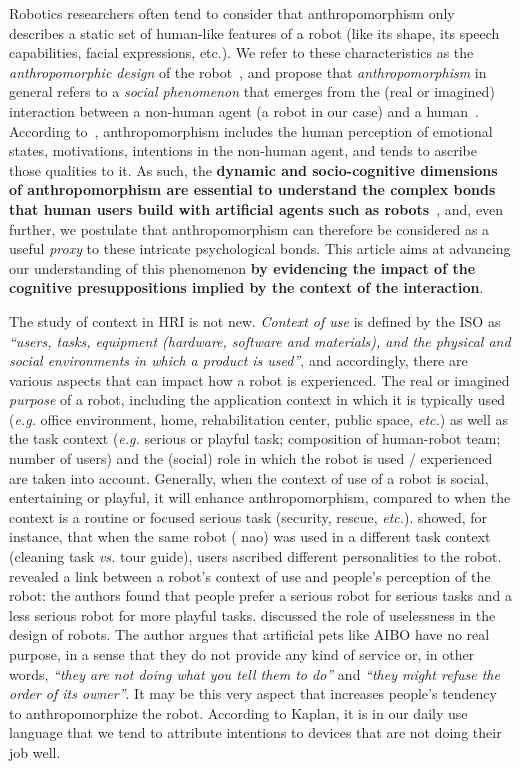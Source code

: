 \documentclass[a4,twocolumn,10pt]{article}
\newcommand{\eg}{\textit{e.g.}\xspace}
\newcommand{\etc}{\textit{etc.}\xspace}
\newcommand{\vs}{\textit{vs.}\xspace}
\begin{document}
Robotics researchers often tend to consider that anthropomorphism only describes
a static set of human-like features of a robot (like its shape, its speech
capabilities, facial expressions, etc.). We refer to these characteristics as
the \emph{anthropomorphic design} of the
robot~\cite{fink_anthropomorphism_2012}, and propose that
\emph{anthropomorphism} in general refers to a \emph{social phenomenon} that
emerges from the (real or imagined) interaction between a non-human agent (a
robot in our case) and a human~\cite{persson_anthropomorphism_2000}.  According
to~\cite{epley_when_2008}, anthropomorphism includes the human perception of
emotional states, motivations, intentions in the non-human agent, and tends to
ascribe those qualities to it. As such, the \textbf{dynamic and socio-cognitive
dimensions of anthropomorphism are essential to understand the complex bonds
that human users build with artificial agents such as
robots}~\cite{lemaignan2014dynamics}, and, even further, we postulate that
anthropomorphism can therefore be considered as a useful \emph{proxy} to these
intricate psychological bonds. This article aims at advancing our understanding
of this phenomenon \textbf{by evidencing the impact of the cognitive
presuppositions implied by the context of the interaction}.

The study of context in HRI is not new. \textit{Context of use} is defined by
the ISO as \textit{``users, tasks, equipment (hardware, software and materials),
and the physical and social environments in which a product is used''}, and
accordingly, there are various aspects that can impact how a robot is
experienced. The real or imagined \textit{purpose} of a robot, including the
application context in which it is typically used (\eg office environment, home,
rehabilitation center, public space, \etc) as well as the task context (\eg
serious or playful task; composition of human-robot team; number of users) and
the (social) role in which the robot is used / experienced are taken into
account. Generally, when the context of use of a robot is social, entertaining
or playful, it will enhance anthropomorphism, compared to when the context is a
routine or focused serious task (security, rescue, \etc).
\cite{joosse_what_2013} showed, for instance, that when the same robot ({\sc
nao}) was used in a different task context (cleaning task \vs tour guide), users
ascribed different personalities to the robot. \cite{goetz_cooperation_2002}
revealed a link between a robot's context of use and people's perception of the
robot: the authors found that people prefer a serious robot for serious tasks
and a less serious robot for more playful tasks. \cite{kaplan_free_2000}
discussed the role of uselessness in the design of robots. The author argues
that artificial pets like AIBO have no real purpose, in a sense that they do not
provide any kind of service or, in other words, \textit{``they are not doing
what you tell them to do''} and \textit{``they might refuse the order of its
owner''}. It may be this very aspect that increases people's tendency to
anthropomorphize the robot. According to Kaplan, it is in our daily use language
that we tend to attribute intentions to devices that are not doing their job
well.
\end{document}
